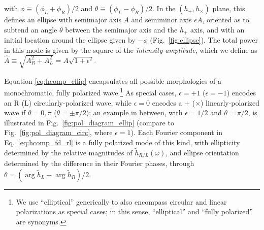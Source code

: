 \documentclass[aps,prd,twocolumn,superscriptaddress,preprintnumbers,floatfix,nofootinbib]{revtex4-2}
\begin{document}
with $\phi \equiv (\phi_L + \phi_R)/2$ and $\theta \equiv (\phi_L - \phi_R)/2$. 
In the $\left(h_+,h_\times\right)$ plane, this defines an ellipse with semimajor axis $A$ and semiminor axis $\epsilon A$, oriented as to subtend an angle $\theta$ between the semimajor axis and the $h_+$ axis, and with an initial location around the ellipse given by $-\phi$ (Fig.~\ref{fig:ellipse}).
The total power in this mode is given by the square of the \emph{intensity amplitude}, which we define as $\hat{A} \equiv \sqrt{A_R^2 + A_L^2} = A \sqrt{1 + \epsilon^2}$.

Equation \eqref{eq:hcomp_ellip} encapsulates all possible morphologies of a monochromatic, fully polarized wave.\footnote{We use ``elliptical'' generically to also encompass circular and linear polarizations as special cases; in this sense, ``elliptical'' and ``fully polarized'' are synonyms.}
As special cases, $\epsilon = +1$ ($\epsilon = -1$) encodes an R (L) circularly-polarized wave, while $\epsilon =0$ encodes a $+$ ($\times$) linearly-polarized wave if $\theta = 0,\pi$ ($\theta = \pm \pi/2$);
an example in between, with $\epsilon=1/2$ and $\theta = \pi/2$, is illustrated in Fig.~\ref{fig:pol_diagram_ellip} (compare to Fig.~\ref{fig:pol_diagram_circ}, where $\epsilon=1$).
Each Fourier component in Eq.~\eqref{eq:hcomp_fd_rl} is a fully polarized mode of this kind, with ellipticity determined by the relative magnitudes of $\tilde{h}_{R/L}(\omega)$, and ellipse orientation determined by the difference in their Fourier phases, through $\theta = (\arg \tilde{h}_L - \arg \tilde{h}_R)/2$.
\end{document}
